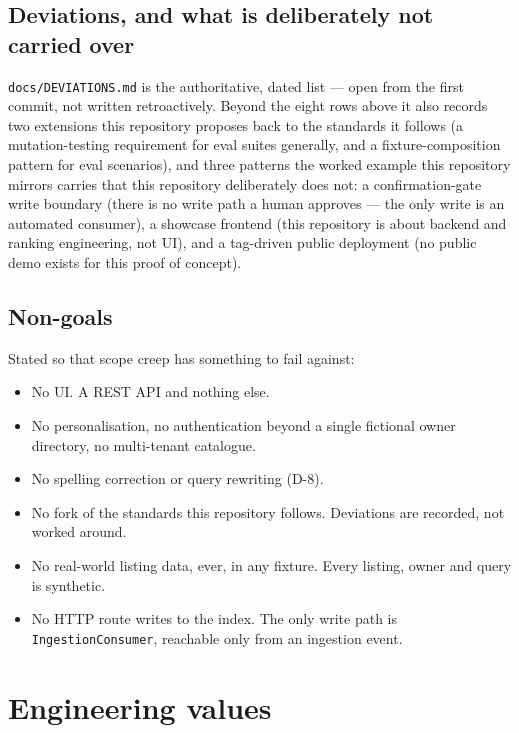 \documentclass[11pt,a4paper]{article}
\begin{document}
\subsection{Deviations, and what is deliberately not carried over}

\texttt{docs/DEVIATIONS.md} is the authoritative, dated list --- open from the
first commit, not written retroactively. Beyond the eight rows above it also
records two extensions this repository proposes back to the standards it
follows (a mutation-testing requirement for eval suites generally, and a
fixture-composition pattern for eval scenarios), and three patterns the worked
example this repository mirrors carries that this repository deliberately does
not: a confirmation-gate write boundary (there is no write path a human
approves --- the only write is an automated consumer), a showcase frontend
(this repository is about backend and ranking engineering, not UI), and a
tag-driven public deployment (no public demo exists for this proof of
concept).

\subsection{Non-goals}

Stated so that scope creep has something to fail against:

\begin{itemize}[leftmargin=1.4em]
  \item No UI. A REST API and nothing else.
  \item No personalisation, no authentication beyond a single fictional owner
        directory, no multi-tenant catalogue.
  \item No spelling correction or query rewriting (D-8).
  \item No fork of the standards this repository follows. Deviations are
        recorded, not worked around.
  \item No real-world listing data, ever, in any fixture. Every listing, owner
        and query is synthetic.
  \item No HTTP route writes to the index. The only write path is
        \texttt{IngestionConsumer}, reachable only from an ingestion event.
\end{itemize}

\section{Engineering values}
\end{document}
